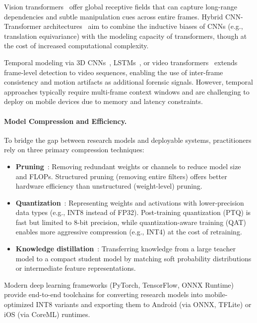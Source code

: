Vision transformers~\cite{dosovitskiy2021vit,liu2021swin} offer global receptive fields that can capture long\hyp range dependencies and subtle manipulation cues across entire frames. Hybrid CNN\hyp Transformer architectures~\cite{coccomini2022efficientnet_vit,khan2022hybrid_transformer_df,genconvit_github} aim to combine the inductive biases of CNNs (e.g., translation equivariance) with the modeling capacity of transformers, though at the cost of increased computational complexity.

Temporal modeling via 3D CNNs~\cite{tran2015c3d,carreira2017i3d}, LSTMs~\cite{zhao2022mobilenet_lstm,xception_convlstm2022}, or video transformers~\cite{bertasius2021timesformer} extends frame\hyp level detection to video sequences, enabling the use of inter\hyp frame consistency and motion artifacts as additional forensic signals. However, temporal approaches typically require multi\hyp frame context windows and are challenging to deploy on mobile devices due to memory and latency constraints.

\paragraph{Model Compression and Efficiency.}
To bridge the gap between research models and deployable systems, practitioners rely on three primary compression techniques:
\begin{itemize}[leftmargin=*,itemsep=2pt,parsep=0pt]
  \item \textbf{Pruning}~\cite{han2015learningboth,han2016deepcompression,blalock2020pruningsurvey}: Removing redundant weights or channels to reduce model size and FLOPs. Structured pruning (removing entire filters) offers better hardware efficiency than unstructured (weight\hyp level) pruning.
  \item \textbf{Quantization}~\cite{jacob2017integeronly,esser2020lsq,gholami2021quant_survey}: Representing weights and activations with lower\hyp precision data types (e.g., INT8 instead of FP32). Post\hyp training quantization (PTQ) is fast but limited to 8\hyp bit precision, while quantization\hyp aware training (QAT) enables more aggressive compression (e.g., INT4) at the cost of retraining.
  \item \textbf{Knowledge distillation}~\cite{hinton2015distilling,romero2015fitnets,gou2021kdsurvey}: Transferring knowledge from a large teacher model to a compact student model by matching soft probability distributions or intermediate feature representations.
\end{itemize}
Modern deep learning frameworks (PyTorch, TensorFlow, ONNX Runtime) provide end\hyp to\hyp end toolchains for converting research models into mobile\hyp optimized INT8 variants and exporting them to Android (via ONNX, TFLite) or iOS (via CoreML) runtimes.

